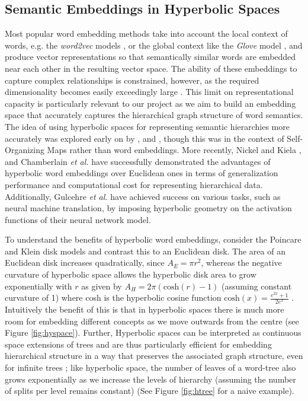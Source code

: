 \documentclass[12pt]{report}
\begin{document}
\subsection{Semantic Embeddings in Hyperbolic Spaces} \label{sec:poincare}
Most popular word embedding methods take into account the local context of words, e.g. the \textit{word2vec} models \cite{Mikolov, Mikolov2013}, or the global context like the \textit{Glove} model \cite{Pennington2014}, and produce vector representations so that semantically similar words are embedded near each other in the resulting vector space. The ability of these embeddings to capture complex relationships is constrained, however, as the required dimensionality becomes easily exceedingly large \cite{Nickel2017, Chamberlain2017, Nickel2018}. This limit on representational capacity is particularly relevant to our project as we aim to build an embedding space that accurately captures the hierarchical graph structure of word semantics. The idea of using hyperbolic spaces for representing semantic hierarchies more accurately was explored early on by \cite{Ritter1999}, \cite{Ontrup2002} and \cite{Walter2006}, though this was in the context of Self-Organizing Maps rather than word embeddings. More recently, Nickel and Kiela \cite{Nickel2017}, and Chamberlain \textit{et al.} \cite{Chamberlain2017} have successfully demonstrated the advantages of hyperbolic word embeddings over Euclidean ones in terms of generalization performance and computational cost for representing hierarchical data. Additionally, Gulcehre \textit{et al.} \cite{Gulcehre2018} have achieved success on various tasks, such as neural machine translation, by imposing hyperbolic geometry on the activation functions of their neural network model.

To understand the benefits of hyperbolic word embeddings, consider the Poincare and Klein disk models and contrast this to an Euclidean disk. The area of an Euclidean disk increases quadratically, since $A_E=\pi r^2$, whereas the negative curvature of hyperbolic space allows the hyperbolic disk area to grow exponentially with $r$ as given by $A_H=2 \pi \left(\text{cosh}(r) - 1 \right)$ (assuming constant curvature of 1) where cosh is the hyperbolic cosine function $\text{cosh}(x)=\frac{e^{2x} + 1}{2e^x}$ \cite{Greenberg1994}. Intuitively the benefit of this is that in hyperbolic spaces there is much more room for embedding different concepts as we move outwards from the centre (see Figure \ref{fig:hyspace}). Further, Hyperbolic spaces can be interpreted as continuous space extensions of trees and are thus particularly efficient for embedding hierarchical structure in a way that preserves the associated graph structure, even for infinite trees \cite{Chamberlain2017}; like hyperbolic space, the number of leaves of a word-tree also grows exponentially as we increase the levels of hierarchy (assuming the number of splits per level remains constant) \cite{Nickel2017} (See Figure \ref{fig:htree} for a naive example). 
\end{document}

